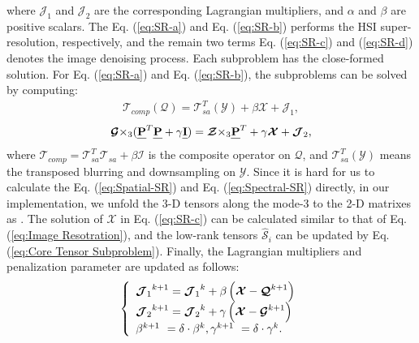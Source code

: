 \documentclass[twocolumn]{svjour3}          %
\begin{document}
    where ${\boldsymbol{\mathcal{J}}_1}$ and ${\boldsymbol{\mathcal{J}}_2}$ are the corresponding Lagrangian multipliers, and $\alpha$ and $\beta$ are positive scalars. The Eq. (\ref{eq:SR-a}) and  Eq. (\ref{eq:SR-b}) performs the HSI super-resolution, respectively, and the remain two terms Eq. (\ref{eq:SR-c}) and (\ref{eq:SR-d}) denotes the image denoising process. Each subproblem has the close-formed solution. For Eq. (\ref{eq:SR-a}) and Eq. (\ref{eq:SR-b}), the subproblems can be solved by computing:
    \begin{equation}\label{eq:Spatial-SR}
    \begin{aligned}
    {\mathcal{T}}_{comp}({\boldsymbol{\mathcal{Q}}}) = {\mathcal{T}}_{sa}^T({\boldsymbol{\mathcal{Y}}}) + \beta {\boldsymbol{\mathcal{X}}} + {{\boldsymbol{\mathcal{J}}}_1},
    \end{aligned}
    \end{equation}
    \begin{equation}\label{eq:Spectral-SR}
    \begin{aligned}
    {\boldsymbol{\mathcal{G}}}{ \times _3}({\textbf{\emph{P}}^T}\textbf{\emph{P}} + \gamma \textbf{\emph{I}}) = {\boldsymbol{\mathcal{Z}}}{ \times _3}{\textbf{\emph{P}}^T} + \gamma {\boldsymbol{\mathcal{X}}} + {\boldsymbol{\mathcal{J}}_2},
    \end{aligned}
    \end{equation}
    where ${\mathcal{T}}_{comp} = {\mathcal{T}}_{sa}^T{{\mathcal{T}}_{sa}} + \beta {\boldsymbol{\mathcal{I}}}$ is the composite operator on ${\boldsymbol{\mathcal{Q}}}$, and ${\mathcal{T}}_{sa}^T({\boldsymbol{\mathcal{Y}}})$ means the transposed blurring and downsampling on ${\boldsymbol{\mathcal{Y}}}$. Since it is hard for us to calculate the Eq. (\ref{eq:Spatial-SR}) and Eq. (\ref{eq:Spectral-SR}) directly, in our implementation, we unfold the 3-D tensors along the mode-3 to the 2-D matrixes as \cite{dong2016hyperspectral}.  The solution of  ${\boldsymbol{\mathcal{X}}}$ in Eq. (\ref{eq:SR-c}) can be calculated similar to that of Eq. (\ref{eq:Image Resotration}), and the low-rank tensors ${\hat{\boldsymbol{\mathcal{S}}}_i}$ can be updated by Eq. (\ref{eq:Core Tensor Subproblem}). Finally, the Lagrangian multipliers and penalization parameter are updated as follows:
    \begin{equation}\label{eq:Lagrangian-update-SR}
    \begin{aligned}
    \left\{ {\begin{array}{*{20}{l}}
    {{{\boldsymbol{\mathcal{J}}_1}^{k + 1}} = {{\boldsymbol{\mathcal{J}}_1}^k} + \beta \left( {{\boldsymbol{\mathcal{X}}} - {\boldsymbol{\mathcal{Q}}}^{k + 1}} \right)}\\
    {{{\boldsymbol{\mathcal{J}}_2}^{k + 1}} = {{\boldsymbol{\mathcal{J}}_2}^k} + \gamma \left( {{\boldsymbol{\mathcal{X}}} - {\boldsymbol{\mathcal{G}}}^{k + 1}} \right)}\\
    {{\beta ^{k + 1}} {\kern 1pt} {\kern 1pt} {\kern 1pt} {\kern 0.5pt} = \delta  \cdot {\beta ^k}}, {{\gamma ^{k + 1}} {\kern 1pt} {\kern 1pt} {\kern 1pt} {\kern 0.5pt} = \delta  \cdot {\gamma ^k}}.
    \end{array}} \right.
    \end{aligned}
    \end{equation}
\end{document}
